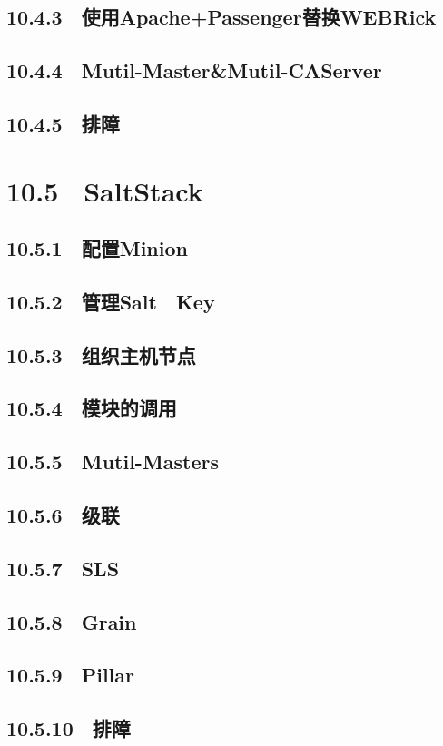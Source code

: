 \documentclass[12pt,UTF8]{ctexbook}
\begin{document}
{\subsection{10.4.3　使用Apache+Passenger替换WEBRick}
\subsection{10.4.4　Mutil-Master\&Mutil-CAServer}
\subsection{10.4.5　排障}
\section{10.5　SaltStack}
\subsection{10.5.1　配置Minion}
\subsection{10.5.2　管理Salt　Key}
\subsection{10.5.3　组织主机节点}
\subsection{10.5.4　模块的调用}
\subsection{10.5.5　Mutil-Masters}
\subsection{10.5.6　级联}
\subsection{10.5.7　SLS}
\subsection{10.5.8　Grain}
\subsection{10.5.9　Pillar}
\subsection{10.5.10　排障}
}
\end{document}
